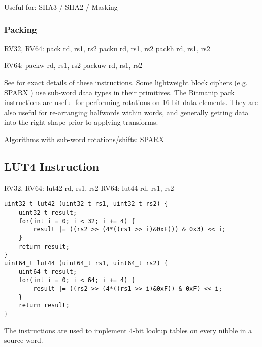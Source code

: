 Useful for: SHA3 / SHA2 / Masking

\subsubsection{Packing}

\begin{cryptobitmanipisa}
RV32, RV64: 
    pack   rd, rs1, rs2
    packu  rd, rs1, rs2
    packh  rd, rs1, rs2

RV64: 
    packw  rd, rs1, rs2
    packuw rd, rs1, rs2
\end{cryptobitmanipisa}

See \cite[Section 2.1.4]{riscv:bitmanip:draft} for exact details of
these instructions.
Some lightweight block ciphers
(e.g. SPARX \cite{DPUVGB:16})
use sub-word data types in their primitives.
The Bitmanip pack instructions are useful for performing rotations on
16-bit data elements.
They are also useful for re-arranging halfwords within words, and
generally getting data into the right shape prior to applying transforms.

Algorithms with sub-word rotations/shifts:
SPARX


\subsection{LUT4 Instruction}

\begin{cryptoisa}
RV32, RV64:
    lut42   rd, rs1, rs2
RV64:
    lut44   rd, rs1, rs2
\end{cryptoisa}

\begin{lstlisting}[style=C]
uint32_t lut42 (uint32_t rs1, uint32_t rs2) {
    uint32_t result;
    for(int i = 0; i < 32; i += 4) {
        result |= ((rs2 >> (4*((rs1 >> i)&0xF))) & 0x3) << i;
    }
    return result;
}
uint64_t lut44 (uint64_t rs1, uint64_t rs2) {
    uint64_t result;
    for(int i = 0; i < 64; i += 4) {
        result |= ((rs2 >> (4*((rs1 >> i)&0xF)) & 0xF) << i;
    }
    return result;
}
\end{lstlisting}

The  instructions are used to implement 4-bit lookup tables
on every nibble in a source word.

